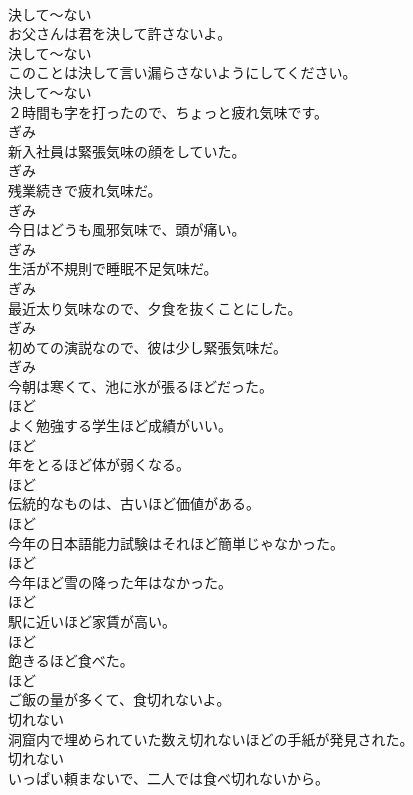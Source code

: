 \documentclass[8pt]{extreport}
\begin{document}
\begin{CJK}{UTF8}{min}
\\	決して～ない
\\	お父さんは君を決して許さないよ。	
\\	決して～ない
\\	このことは決して言い漏らさないようにしてください。	
\\	決して～ない
\\	２時間も字を打ったので、ちょっと疲れ気味です。	
\\	ぎみ
\\	新入社員は緊張気味の顔をしていた。	
\\	ぎみ
\\	残業続きで疲れ気味だ。	
\\	ぎみ
\\	今日はどうも風邪気味で、頭が痛い。	
\\	ぎみ
\\	生活が不規則で睡眠不足気味だ。	
\\	ぎみ
\\	最近太り気味なので、夕食を抜くことにした。	
\\	ぎみ
\\	初めての演説なので、彼は少し緊張気味だ。	
\\	ぎみ
\\	今朝は寒くて、池に氷が張るほどだった。	
\\	ほど
\\	よく勉強する学生ほど成績がいい。	
\\	ほど
\\	年をとるほど体が弱くなる。	
\\	ほど
\\	伝統的なものは、古いほど価値がある。	
\\	ほど
\\	今年の日本語能力試験はそれほど簡単じゃなかった。	
\\	ほど
\\	今年ほど雪の降った年はなかった。	
\\	ほど
\\	駅に近いほど家賃が高い。	
\\	ほど
\\	飽きるほど食べた。	
\\	ほど
\\	ご飯の量が多くて、食切れないよ。	
\\	切れない
\\	洞窟内で埋められていた数え切れないほどの手紙が発見された。	
\\	切れない
\\	いっぱい頼まないで、二人では食べ切れないから。	

\end{CJK}
\end{document}
